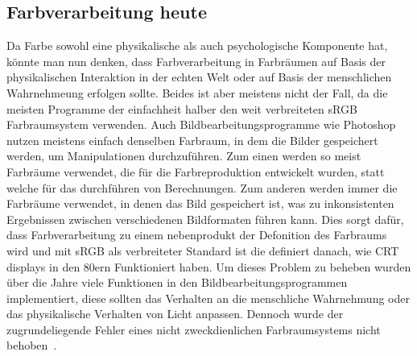 \documentclass[12pt, a4paper, ngerman]{article}
\begin{document}
\subsection{Farbverarbeitung heute}
Da Farbe sowohl eine physikalische als auch psychologische Komponente hat, könnte man nun denken, 
dass Farbverarbeitung in Farbräumen auf Basis der physikalischen Interaktion in der echten Welt oder 
auf Basis der menschlichen Wahrnehmeung erfolgen sollte.
Beides ist aber meistens nicht der Fall, da die meisten Programme der einfachheit halber den weit verbreiteten sRGB Farbraumsystem verwenden.
Auch Bildbearbeitungsprogramme wie Photoshop nutzen meistens einfach denselben Farbraum, 
in dem die Bilder gespeichert werden, um Manipulationen durchzuführen. 
Zum einen werden so meist Farbräume verwendet, die für die Farbreproduktion entwickelt wurden, 
statt welche für das durchführen von Berechnungen.
Zum anderen werden immer die Farbräume verwendet, in denen das Bild gespeichert ist, 
was zu inkonsistenten Ergebnissen zwischen verschiedenen Bildformaten führen kann.
Dies sorgt dafür, dass Farbverarbeitung zu einem nebenprodukt der Defonition des Farbraums wird und 
mit sRGB als verbreiteter Standard ist die definiert danach, wie \acs{CRT} displays in den 80ern Funktioniert haben.
Um dieses Problem zu beheben wurden über die Jahre viele Funktionen in den Bildbearbeitungsprogrammen implementiert, 
diese sollten das Verhalten an die menschliche Wahrnehmung oder das physikalische Verhalten von Licht anpassen. 
Dennoch wurde der zugrundeliegende Fehler eines nicht zweckdienlichen Farbraumsystems nicht behoben~\cite{Ottosson_2020}.
\end{document}
